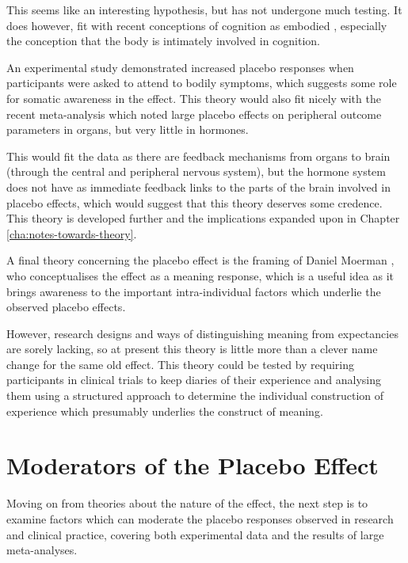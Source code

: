 This seems like an interesting hypothesis, but has not undergone much testing. It does however, fit with recent conceptions of cognition as embodied \cite{wilson2002six}, especially the conception that the body is intimately involved in cognition.  

An experimental study \cite{Geers2006} demonstrated increased placebo responses when participants were asked to attend to bodily symptoms, which suggests some role for somatic awareness in the effect. This theory would also fit nicely with the recent meta-analysis \cite{Meissner2007} which noted large placebo effects on peripheral outcome parameters in organs, but very little in hormones. 

This would fit the data as there are feedback mechanisms from organs to brain (through the central and peripheral nervous system), but the hormone system does not have as immediate feedback links to the parts of the brain involved in placebo effects, which would suggest that this theory deserves some credence. This theory is developed further and the implications expanded upon in Chapter \ref{cha:notes-towards-theory}.

A final theory concerning the placebo effect is the framing of Daniel Moerman \cite{Moerman2000a,Moerman2003}, who conceptualises the effect as a meaning response, which is a useful idea as it brings awareness to the important intra-individual factors which underlie the observed placebo effects. 

However, research designs and ways of distinguishing meaning from expectancies are sorely lacking, so at present this theory is little more than a clever name change for the same old effect.  This theory  could be tested by requiring participants in clinical trials to keep diaries of their experience and analysing them using a structured approach to determine the individual construction of experience which presumably underlies the construct of meaning. 


\section{Moderators of the Placebo Effect}
\label{sec:moder-plac-effect}

Moving on from theories about the nature of the effect, the next step is to examine factors which can moderate the placebo responses observed in research and clinical practice, covering both experimental data and the results of large meta-analyses. 


